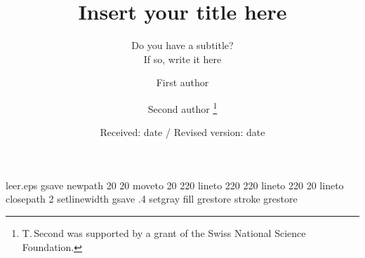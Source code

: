 %
%
%
%
\begin{filecontents*}{leer.eps}
gsave
newpath
  20 20 moveto
  20 220 lineto
  220 220 lineto
  220 20 lineto
closepath
2 setlinewidth
gsave
  .4 setgray fill
grestore
stroke
grestore
\end{filecontents*}
%
\documentclass[probth,referee]{svjour}
%
\usepackage{graphics}
%

%
\title{Insert your title here}
\subtitle{Do you have a subtitle?\\ If so, write it here}
\author{First author \and Second author%
\thanks{T.\,Second was supported by a grant of the Swiss
National Science Foundation.}
}                     %
%
\offprints{}          %
%
%
\date{Received: date / Revised version: date}
%
\maketitle
%
\begin{abstract}
Insert your abstract here.
\end{abstract}
%
\section{Introduction}
\label{intro}
Your text comes here. Separate text sections with
\section{Section title}
\label{sec:1}
and \cite{RefJ}
